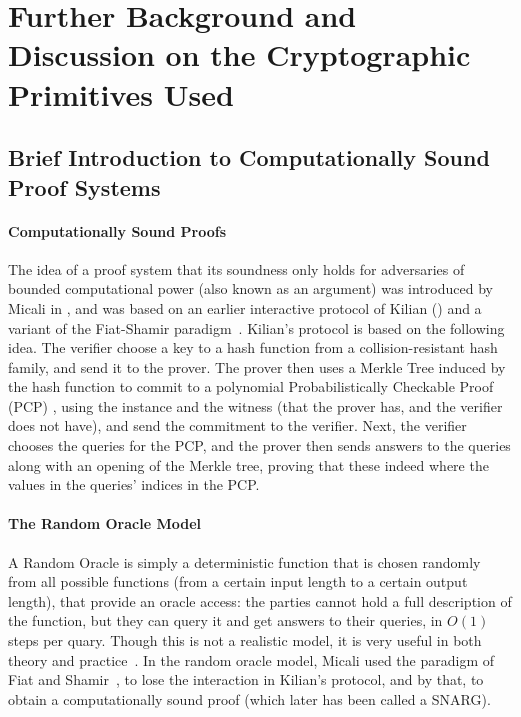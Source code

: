 \section{Further Background and Discussion on the Cryptographic Primitives Used}
\label{app:crypto}
\subsection{Brief Introduction to Computationally Sound Proof Systems}
\paragraph{Computationally Sound Proofs}
The idea of a proof system that its soundness only holds for adversaries of bounded computational power (also known as an argument) was introduced by Micali in \cite{micali2000computationally}, and was based on an earlier interactive protocol of Kilian (\cite{kilian1992note}) and a variant of the Fiat-Shamir paradigm~\cite{fiat1986prove}.
Kilian's protocol is based on the following idea. The verifier choose a key to a hash function from a collision-resistant hash family, and send it to the prover. The prover then uses a Merkle Tree \cite{merkle1989certified} induced by the hash function to commit to a polynomial Probabilistically Checkable Proof (PCP) \cite{babai1991checking, arora1998probabilistic, arora1998proof, feige1991approximating}, using the instance and the witness (that the prover has, and the verifier does not have), and send the commitment to the verifier. Next, the verifier chooses the queries for the PCP, and the prover then sends answers to the queries along with an opening of the Merkle tree, proving that these indeed where the values in the queries' indices in the PCP.
\paragraph{The Random Oracle Model}
A Random Oracle is simply a deterministic function that is chosen randomly from all possible functions (from a certain input length to a certain output length), that provide an oracle access: the parties cannot hold a full description of the function, but they can query it and get answers to their queries, in $O(1)$ steps per quary. Though this is not a realistic model, it is very useful in both theory and practice~\cite{ROM93BMR}. In the random oracle model, Micali used the paradigm of Fiat and Shamir~\cite{fiat1986prove}, to lose the interaction in Kilian's protocol, and by that, to obtain a computationally sound proof (which later has been called a SNARG).

